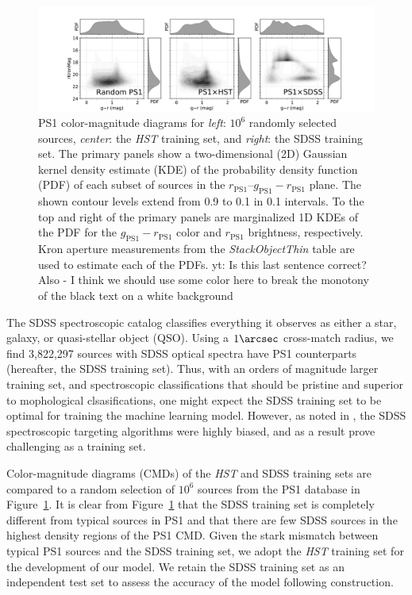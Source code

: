 \documentclass[twocolumn]{aastex62}
\newcommand{\yutaro}[1]{{\color{red} yt: {#1}}}
\begin{document}
\begin{figure}[htb]
 \centering
  \includegraphics[width=7.2in]{./Figures/ColorMagDiagramComb.pdf}
  \caption{
  PS1 color-magnitude diagrams for \textit{left}: $10^6$ randomly selected sources, \textit{center}: the \textit{HST} training set, and \textit{right}: the SDSS training set. The primary panels show a two-dimensional (2D) Gaussian kernel density estimate (KDE) of the probability density function (PDF) of each subset of sources in the $r_\mathrm{PS1}$--$g_\mathrm{PS1} - r_\mathrm{PS1}$ plane. The shown contour levels extend from 0.9 to 0.1 in 0.1 intervals. To the top and right of the primary panels are marginalized 1D KDEs of the PDF for the $g_\mathrm{PS1} - r_\mathrm{PS1}$ color and $r_\mathrm{PS1}$ brightness, respectively. Kron aperture measurements from the \textit{StackObjectThin} table are used to estimate each of the PDFs. \yutaro{Is this last sentence correct? Also - I think we should use some color here to break the monotony of the black text on a white background}
  }
  \label{fig:cmd}
\end{figure}

The SDSS spectroscopic catalog classifies everything it observes as either a
star, galaxy, or quasi-stellar object (QSO). Using a $1\arcsec$ cross-match
radius, we find 3,822,297 sources with SDSS optical spectra have PS1
counterparts (hereafter, the SDSS training set). Thus, with an orders of
magnitude larger training set, and spectroscopic classifications that should
be pristine and superior to mophological clsasifications, one might expect
the SDSS training set to be optimal for training the machine learning model.
However, as noted in \citep{Miller17}, the SDSS spectroscopic targeting
algorithms were highly biased, and as a result prove challenging as a
training set.

Color-magnitude diagrams (CMDs) of the \textit{HST} and SDSS training sets
are compared to a random selection of $10^6$ sources from the PS1 database in
Figure~\ref{fig:cmd}. It is clear from Figure~\ref{fig:cmd} that the SDSS
training set is completely different from typical sources in PS1 and that
there are few SDSS sources in the highest density regions of the PS1 CMD.
Given the stark mismatch between typical PS1 sources and the SDSS training
set, we adopt the \textit{HST} training set for the development of our model.
We retain the SDSS training set as an independent test set to assess the
accuracy of the model following construction.
\end{document}
